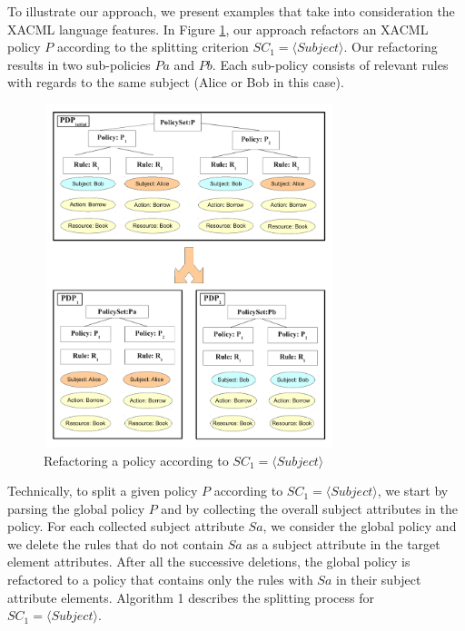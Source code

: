 To illustrate our approach, we present examples that take into consideration the XACML language features. In Figure \ref{splitting}, our approach refactors an XACML policy $P$  according to the splitting criterion $SC_{1}=\langle Subject\rangle$. Our 
refactoring results in two sub-policies $Pa$ and $Pb$. Each sub-policy consists of relevant rules with regards to the same subject (Alice or Bob in this case). 

\begin{figure}[!h]
\begin{center}
\includegraphics[width=8.5cm, height=10cm]{splitting}
\caption{Refactoring a policy according to $SC_{1}=\langle Subject\rangle$}
\label{splitting}
\end{center}
\end{figure}
Technically, to split a given policy $P$ according to $SC_{1}=\langle Subject\rangle$, we start by parsing the global policy $P$ 
and by collecting the overall subject attributes in the policy. For each collected subject attribute $Sa$, we consider the global policy and we 
delete the rules that do not contain $Sa$ as a subject attribute in the target element attributes. After all the successive deletions, the global 
policy is refactored to a policy that contains only the rules with $Sa$ in their subject attribute elements. 
Algorithm 1 describes the splitting process for $SC_{1}=\langle Subject\rangle$.

